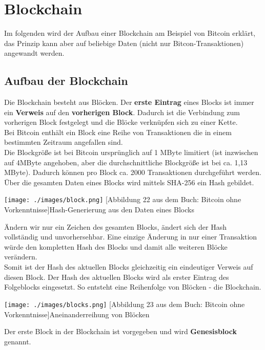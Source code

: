 \documentclass[10pt,a4paper,titlepage]{article}
\begin{document}
\section{Blockchain}
Im folgenden wird der Aufbau einer Blockchain am Beispiel von Bitcoin erklärt, das Prinzip kann aber auf beliebige Daten (nicht nur Bitcon-Transaktionen) angewandt werden.
\subsection{Aufbau der Blockchain}
Die Blockchain besteht aus Blöcken. Der \textbf{erste Eintrag} eines Blocks ist immer ein \textbf{Verweis} auf den \textbf{vorherigen Block}. Dadurch ist die Verbindung zum vorherigen Block festgelegt und die Blöcke verknüpfen sich zu einer Kette.\\
Bei Bitcoin enthält ein Block eine Reihe von Transaktionen die in einem bestimmten Zeitraum angefallen sind.\\
Die Blockgröße ist bei Bitcoin ursprünglich auf 1 MByte limitiert (ist inzwischen auf 4MByte angehoben, aber die durchschnittliche Blockgröße ist bei ca. 1,13 MByte). Dadurch können pro Block ca. 2000 Transaktionen durchgeführt werden.
Über die gesamten Daten eines Blocks wird mittels SHA-256 ein Hash gebildet.
\begin{center}
\texttt{[image: ./images/block.png]}
[Abbildung 22 aus dem Buch: Bitcoin ohne Vorkenntnisse]{Hash-Generierung aus den Daten eines Blocks}
\end{center}
Ändern wir nur ein Zeichen des gesamten Blocks, ändert sich der Hash
vollständig und unvorhersehbar. Eine einzige Änderung in nur einer Transaktion würde den kompletten Hash des Blocks und damit alle weiteren Blöcke verändern.\\
Somit ist der Hash des aktuellen Blocks gleichzeitig ein eindeutiger Verweis auf diesen Block. Der Hash des aktuellen Blocks wird als erster Eintrag des Folgeblocks eingesetzt. So entsteht eine Reihenfolge von Blöcken - die Blockchain.
\begin{center}
\texttt{[image: ./images/blocks.png]}
[Abbildung 23 aus dem Buch: Bitcoin ohne Vorkenntnisse]{Aneinanderreihung von Blöcken}
\end{center}
Der erste Block in der Blockchain ist vorgegeben und wird \textbf{Genesisblock} genannt. 
\end{document}
